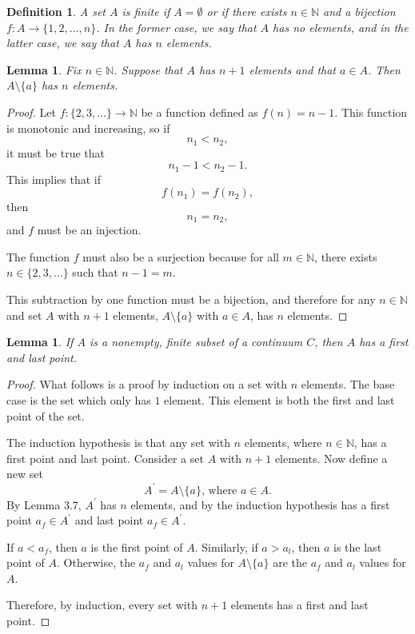 \documentclass{amsart}
\newtheorem{lemma}[theorem]{Lemma}
\newtheorem{definition}[theorem]{Definition}
\newcommand{\N}{\mathbb N}
\newcommand{\1}{\mathds{1}}
\def \N {{\mathbb {N}}}
\numberwithin{equation}{section}
\numberwithin{theorem}{section}
\begin{document}
\begin{definition}
	A set $A$ is finite if $A= \emptyset$ or if there exists $n\in\N$ and a bijection $f: A \to \{1,2,\dots, n\}$.  In the former case, we say that $A$ has no elements, and in the latter case, we say that $A$ has $n$ elements.
\end{definition}

\begin{lemma}
	Fix $n\in \N$.  Suppose that $A$ has $n+1$ elements and that $a\in A$.  Then $A\setminus\{a\}$ has $n$ elements.
\end{lemma}

\begin{proof}
	
	Let $f:\{2,3,\dots\}\to\N$ be a function defined as $f(n)=n-1$. This function is monotonic and increasing, so if $$n_1<n_2,$$ it must be true that $$n_1-1<n_2-1.$$ This implies that if $$f(n_1)=f(n_2),$$ then $$n_1=n_2,$$ and $f$ must be an injection. 
	
	The function $f$ must also be a surjection because for all $m\in\N$, there exists $n\in\{2,3,\dots\}$ such that $n-1=m$. 
	
	This subtraction by one function must be a bijection, and therefore for any $n\in\N$ and set $A$ with $n+1$ elements, $A\setminus\{a\}$ with $a\in A$, has $n$ elements.
\end{proof}

\begin{lemma}  If $A$ is a nonempty, finite subset of a continuum $C$, then $A$ has a first and last point.
\end{lemma}

\begin{proof}
	What follows is a proof by induction on a set with $n$ elements. The base case is the set which only has $1$ element. This element is both the first and last point of the set. 
	
	The induction hypothesis is that any set with $n$ elements, where $n\in\N$, has a first point and last point. Consider a set $A$ with $n+1$ elements. Now define a new set $$A^\prime=A\setminus\{a\}\text{, where } a\in A.$$ By Lemma 3.7, $A^\prime$ has $n$ elements, and by the induction hypothesis has a first point $a_f\in A^\prime$ and last point $a_f\in A^\prime$. 

	If $a< a_f$, then $a$ is the first point of $A$. Similarly, if $a> a_l$, then $a$ is the last point of $A$. Otherwise, the $a_f$ and $a_l$ values for $A\setminus \{a\}$ are the $a_f$ and $a_l$ values for $A$. 
	
	Therefore, by induction, every set with $n+1$ elements has a first and last point.
\end{proof}
\end{document}
